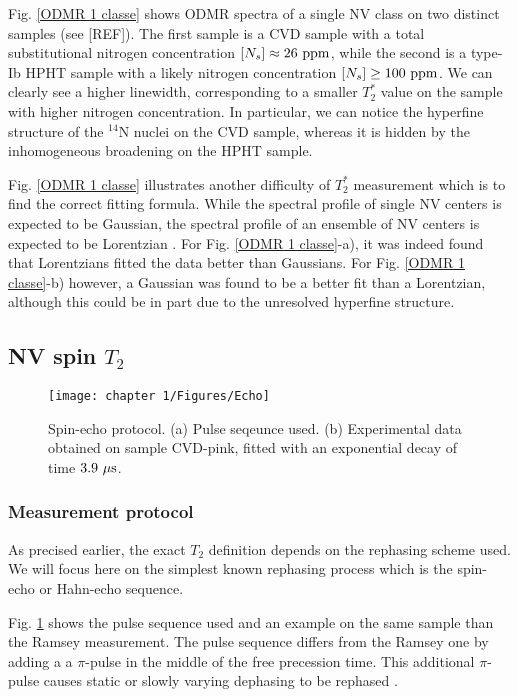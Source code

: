 \documentclass[a4paper,11pt]{report}
\begin{document}
\begin{refsection}
Fig. \ref{ODMR 1 classe} shows ODMR spectra of a single NV class on two distinct samples (see [REF]). The first sample is a CVD sample with a total substitutional nitrogen  concentration $[N_s] \approx 26\ \rm ppm$, while the second is a type-Ib HPHT sample with a likely nitrogen concentration $[N_s] \geq 100\ \rm ppm$. We can clearly see a higher linewidth, corresponding to a smaller $T_2^*$ value on the sample with higher nitrogen concentration. In particular, we can notice the hyperfine structure of the $^{14}$N nuclei on the CVD sample, whereas it is hidden by the inhomogeneous broadening on the HPHT sample.

Fig. \ref{ODMR 1 classe} illustrates another difficulty of $T_2^*$ measurement which is to find the correct fitting formula. While the spectral profile of single NV centers is expected to be Gaussian, the spectral profile of an ensemble of NV centers  is expected to be Lorentzian \citep{dobrovitski2008decoherence, hall2014analytic}. For Fig. \ref{ODMR 1 classe}-a), it was indeed found that Lorentzians fitted the data better than Gaussians. For Fig. \ref{ODMR 1 classe}-b) however, a Gaussian was found to be a better fit than a Lorentzian, although this could be in part due to the unresolved hyperfine structure.

\subsection{NV spin $T_2$}
\begin{figure}[h!]
\centering
\texttt{[image: chapter 1/Figures/Echo]}
\caption{Spin-echo protocol. (a) Pulse seqeunce used. (b) Experimental data obtained on sample CVD-pink, fitted with an exponential decay of time $3.9\ \rm{\mu s}$.} 
\label{Echo}
\end{figure}
\subsubsection{Measurement protocol}
As precised earlier, the exact $T_2$ definition depends on the rephasing scheme used. We will focus here on the simplest known rephasing process which is the spin-echo or Hahn-echo sequence.

Fig. \ref{Echo} shows the pulse sequence used and an example on the same sample than the Ramsey measurement. The pulse sequence differs from the Ramsey one by adding a a $\pi$-pulse in the middle of the free precession time. This additional $\pi$-pulse causes static or slowly varying dephasing to be rephased \citep{hahn1950spin}. 


\end{refsection}
\end{document}
